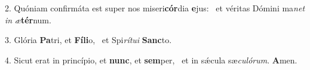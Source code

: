2. Quóniam confirmáta est super nos miseri\textbf{cór}dia \textbf{e}jus: \ast\  et véritas Dómini ma\textit{net} \textit{in} \textit{æ}\textbf{tér}num.\

3. Glória \textbf{Pa}tri, et \textbf{Fí}\textbf{li}o, \ast\  et Spi\textit{rí}\textit{tu}\textit{i} \textbf{Sanc}to.\

4. Sicut erat in princípio, et \textbf{nunc}, et \textbf{sem}per, \ast\  et in sǽcula sæ\textit{cu}\textit{ló}\textit{rum}. \textbf{A}men.\

